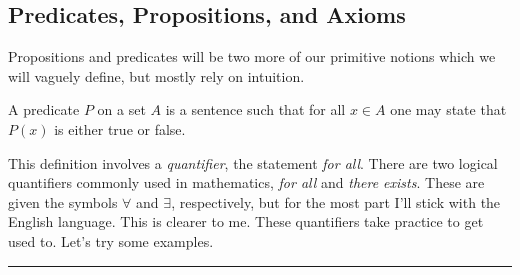         \subsection{Predicates, Propositions, and Axioms}
            Propositions and predicates will be two more of our primitive
            notions which we will vaguely define, but mostly rely on intuition.
            \begin{definition}
                \label{def:Predicate}%
                A \gls{predicate} $P$ on a \gls{set} $A$ is a sentence such
                that for all $x\in{A}$ one may state that $P(x)$ is either
                true or false.
            \end{definition}
            This definition involves a \textit{quantifier}, the statement
            \textit{for all}. There are two logical quantifiers commonly used
            in mathematics, \textit{for all} and \textit{there exists}. These
            are given the symbols $\forall$ and $\exists$, respectively, but
            for the most part I'll stick with the English language. This is
            clearer to me. These quantifiers take practice to get used to. Let's
            try some examples.
            \par\hfill\par\hrule
